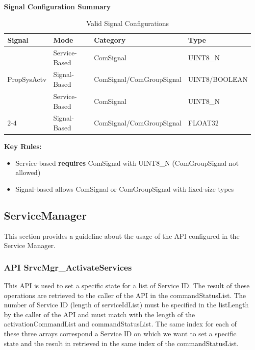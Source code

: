 \textbf{Signal Configuration Summary} 

\begin{table}[H]
\centering
\begin{tabular}{|l|l|l|l|}
\hline
\textbf{Signal} & \textbf{Mode} & \textbf{Category} & \textbf{Type} \\ \hline
\multirow{3}{*}{PropSysActv} & Service-Based & ComSignal & UINT8\_N \\ \cline{2-4} 
 & Signal-Based & ComSignal/ComGroupSignal & UINT8/BOOLEAN \\ \hline
\multirow{3}{*}{VehSpdAvgDrvn} & Service-Based & ComSignal & UINT8\_N \\ \cline{2-4} 
 & Signal-Based & ComSignal/ComGroupSignal & FLOAT32 \\ \hline
\end{tabular}
\caption{Valid Signal Configurations}
\label{tab:signalconfigs}
\end{table}

\textbf{Key Rules:}
\begin{itemize}
	\item Service-based \textbf{requires} ComSignal with UINT8\_N (ComGroupSignal not allowed)
	\item Signal-based allows ComSignal or ComGroupSignal with fixed-size types
\end{itemize}


\subsection{ServiceManager}
\label{SrvcMgr}

This section provides a guideline about the usage of the API configured in the Service Manager.

\subsubsection{API SrvcMgr\_ActivateServices}
This API is used to set a specific state for a list of Service ID. The result of these operations are retrieved to the caller of the API in the commandStatusList.
The number of Service ID (length of serviceIdList) must be specified in the listLength by the caller of the API and must match with the length of the 
activationCommandList and commandStatusList. 
The same index for each of these three arrays correspond a Service ID on which we want to set a specific state and the result in retrieved in the same index
of the commandStatusList.

